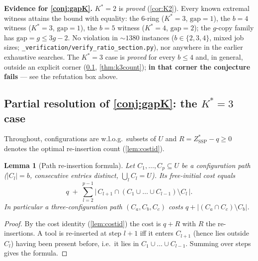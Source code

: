 \documentclass[11pt,a4paper]{article}
\theoremstyle{plain}
\newtheorem{lemma}[theorem]{Lemma}
\theoremstyle{definition}
\newcommand{\Kstar}{K^{*}}
\newcommand{\ZSSP}{Z_{\mathrm{SSP}}^{*}}
\begin{document}
\begin{openproblem}
\textbf{Evidence for \cref{conj:gapK}.}
$\Kstar=2$ is \emph{proved} (\cref{cor:K2}). Every known extremal witness attains the
bound with equality: the $6$-ring ($\Kstar{=}3$, $\mathrm{gap}{=}1$), the $b{=}4$ witness
($\Kstar{=}3$, $\mathrm{gap}{=}1$), the $b{=}5$ witness ($\Kstar{=}4$, $\mathrm{gap}{=}2$);
the $g$-copy family has $\mathrm{gap}=g\le3g-2$. No violation in $\sim\!1380$ instances
($b\in\{2,3,4\}$, mixed job sizes; \texttt{\_verification/verify\_ratio\_section.py}),
nor anywhere in the earlier exhaustive searches. The $\Kstar=3$ case is
\emph{proved} for every $b\le4$ and, in general, outside an explicit corner
(\cref{ssec:k3}, \cref{thm:k3count}); \textbf{in that corner the conjecture
fails} --- see the refutation box above.
\end{openproblem}

\subsection{Partial resolution of \cref{conj:gapK}: the $\Kstar=3$ case}
\label{ssec:k3}


Throughout, configurations are w.l.o.g.\ subsets of $U$ and $R=\ZSSP-q\ge0$ denotes
the optimal re-insertion count (\cref{lem:costid}).

\begin{thmbox}
\begin{lemma}[Path re-insertion formula]
\label{lem:pathR}
Let $C_1,\dots,C_p\subseteq U$ be a configuration path ($|C_l|=b$, consecutive
entries distinct, $\bigcup_l C_l=U$). Its free-initial cost equals
\[
  q\;+\;\sum_{l=2}^{p-1}\bigl|\,C_{l+1}\cap(C_1\cup\dots\cup C_{l-1})\setminus
  C_l\,\bigr| .
\]
In particular a three-configuration path $(C_a,C_b,C_c)$ costs
$q+|(C_a\cap C_c)\setminus C_b|$.
\end{lemma}
\end{thmbox}
\begin{proofbox}
\begin{proof}
By the cost identity (\cref{lem:costid}) the cost is $q+R$ with $R$ the
re-insertions. A tool is re-inserted at step $l+1$ iff it enters $C_{l+1}$ (hence
lies outside $C_l$) having been present before, i.e.\ it lies in
$C_1\cup\dots\cup C_{l-1}$. Summing over steps gives the formula.
\end{proof}
\end{proofbox}
\end{document}

